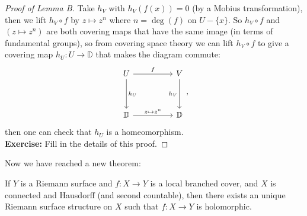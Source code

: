\documentclass{article}
\begin{document}
\begin{proof}[Proof of Lemma B]
    Take $h_V$ with $h_V(f(x)) = 0$ (by a Mobius transformation), then we lift $h_V \circ f$ by $z \mapsto z^n$ where $n = \operatorname{deg}(f)$ on $U - \{x\}$. So $h_V \circ f$ and $(z \mapsto z^n)$ are both covering maps that have the same image (in terms of fundamental groups), so from covering space theory we can lift $h_V \circ f$ to give a covering map $h_U: U \to \mathbb{D}$ that makes the diagram commute:
    \[\begin{tikzcd}
	U && V \\
	\\
	{\mathbb{D}} && {\mathbb{D}}
	\arrow["{h_U}", from=1-1, to=3-1]
	\arrow["f", from=1-1, to=1-3]
	\arrow["{h_V}"', from=1-3, to=3-3]
	\arrow["{z \mapsto z^n}", from=3-1, to=3-3]
\end{tikzcd},\]
then one can check that $h_U$ is a homeomorphism.\\

\textbf{Exercise:} Fill in the details of this proof.
\end{proof}

Now we have reached a new theorem:
\begin{theorem}
    If $Y$ is a Riemann surface and $f: X \to Y$ is a local branched cover, and $X$ is connected and Hausdorff (and second countable), then there exists an unique Riemann surface structure on $X$ such that $f: X \to Y$ is holomorphic.
\end{theorem}
\end{document}
